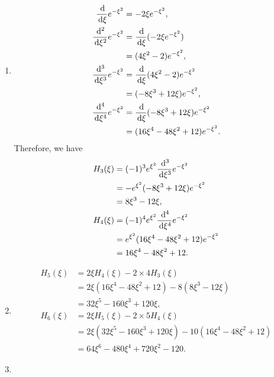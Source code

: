 \documentclass[en, oneside]{vivi}
\begin{document}
\begin{sol}
    \begin{enumerate}[label=(\alph*)]
        \item \begin{align*}
            \frac{\dif}{ \dif \xi} e^{-\xi^2} &= -2\xi e^{-\xi^2},\\
            \frac{\dif^2}{\dif \xi^2} e^{-\xi^2} &= \frac{\dif}{\dif \xi} (-2\xi e^{-\xi^2})\\
            &= (4\xi^2 - 2) e^{-\xi^2},\\
            \frac{\dif^3}{\dif \xi^3} e^{-\xi^2} &= \frac{\dif}{\dif \xi} (4\xi^2 - 2) e^{-\xi^2}\\
            &= (-8\xi^3 + 12\xi) e^{-\xi^2},\\
            \frac{\dif^4}{\dif \xi^4} e^{-\xi^2} &= \frac{\dif}{\dif \xi} (-8\xi^3 + 12\xi) e^{-\xi^2}\\
            &= (16\xi^4 - 48\xi^2 + 12) e^{-\xi^2}.
        \end{align*}
        Therefore, we have
        \begin{align*}
            H_3(\xi) &= (-1)^3 e^{\xi^2} \frac{\dif^3}{\dif \xi^3} e^{-\xi^2}\\
            &= -e^{\xi^2} (-8\xi^3 + 12\xi) e^{-\xi^2}\\
            &= 8\xi^3 - 12\xi,\\
            H_4(\xi) &= (-1)^4 e^{\xi^2} \frac{\dif^4}{\dif \xi^4} e^{-\xi^2}\\
            &= e^{\xi^2} (16\xi^4 - 48\xi^2 + 12) e^{-\xi^2}\\
            &= 16\xi^4 - 48\xi^2 + 12.
        \end{align*}
        \item \begin{align*}
            H_5(\xi) &= 2\xi H_4(\xi) - 2 \times 4 H_3(\xi)\\
            &= 2\xi (16\xi^4 - 48\xi^2 + 12) - 8(8\xi^3 - 12\xi)\\
            &= 32\xi^5 - 160\xi^3 + 120\xi,\\
            H_6(\xi) &= 2\xi H_5(\xi) - 2 \times 5 H_4(\xi)\\
            &= 2\xi (32\xi^5 - 160\xi^3 + 120\xi) - 10(16\xi^4 - 48\xi^2 + 12)\\
            &= 64\xi^6 - 480\xi^4 + 720\xi^2 - 120.
        \end{align*}
        \item \begin{align*}

\end{align*}
\end{enumerate}
\end{sol}
\end{document}
